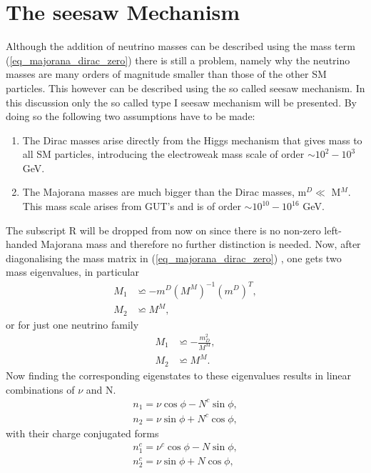 \section{The seesaw Mechanism}
Although the addition of neutrino masses can be described using the mass term (\ref{eq_majorana_dirac_zero})
there is still a problem, namely why the neutrino masses are many orders of magnitude smaller than those of the other SM particles. This however can be described using the so called seesaw mechanism. In this discussion only the so called type I seesaw mechanism will be presented. By doing so the following two assumptions have to be made:
\begin{enumerate}
	\item The Dirac masses arise directly from the Higgs mechanism that gives mass to all SM particles, introducing the electroweak mass scale of order $\sim10^2-10^3$ GeV.
	\item The Majorana masses are much bigger than the Dirac masses, m$^D\ll$ M$^M$. This mass scale arises from GUT's and is of order $\sim10^{10}-10^{16}$ GeV.
\end{enumerate}
The subscript R will be dropped from now on since there is no non-zero left-handed Majorana mass and therefore no further distinction is needed.\newline\indent
Now, after diagonalising the mass matrix in (\ref{eq_majorana_dirac_zero}) \cite[pp. 2-3]{Lindner:2001hr}, one gets two mass eigenvalues, in particular
\begin{align*}
	M_1&\backsimeq-m^D{\left(M^M\right)}^{-1}{\left(m^D\right)}^{T},\\
	M_2&\backsimeq M^M,
\end{align*}
or for just one neutrino family
\begin{align}
	M_1&\backsimeq -\frac{m_D^2}{M^M},
	\label{eq:light_neutrino}
	\\
	M_2&\backsimeq M^M.
	\label{eq:heavy_neutrino}
\end{align}
Now finding the corresponding eigenstates to these eigenvalues results in linear combinations of $\nu$ and N.
\begin{align}
	n_{1}=\nu\cos\phi-N^c\sin\phi,
	\label{eq:n1}
	\\
	n_{2}=\nu\sin\phi+N^c\cos\phi,
	\label{eq:n2}
\end{align}
with their charge conjugated forms
\begin{align}
n_{1}^c=\nu^c\cos\phi-N\sin\phi,
\label{eq:n1C}
\\
n_{2}^c=\nu\sin\phi+N\cos\phi,
\label{eq:n2C}
\end{align}
